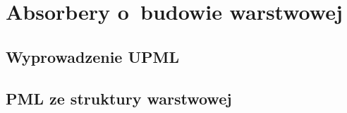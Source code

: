 \chapter{Absorbery o~budowie warstwowej}
\label{roz:pml}

\section{Wyprowadzenie UPML}

\section{PML ze struktury warstwowej~\cite{ania2015}}

